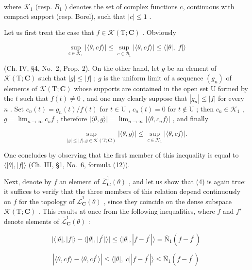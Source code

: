 where \(\mathcal{K}_{1}\) (resp. \(B_{1}\) ) denotes the set of complex functions c, continuous with compact support (resp. Borel), such that \(|c| \leqslant 1\) .

Let us first treat the case that \(f \in \mathcal{K}(\mathrm{T};\mathbf{C})\) . Obviously

\[
\sup _ {c \in \mathcal {K} _ {1}} | \langle \theta , c f \rangle | \leqslant \sup _ {c \in \mathcal {B} _ {1}} | \langle \theta , c f \rangle | \leqslant \langle | \theta |, | f | \rangle
\]

(Ch. IV, §4, No.~2, Prop. 2). On the other hand, let \(g\) be an element of \(\mathcal{K}(\mathrm{T};\mathbf{C})\) such that \(|g| \leqslant |f|\) ; \(g\) is the uniform limit of a sequence \((g_n)\) of elements of \(\mathcal{K}(\mathrm{T};\mathbf{C})\) whose supports are contained in the open set \(\mathrm{U}\) formed by the \(t\) such that \(f(t) \neq 0\) , and one may clearly suppose that \(|g_n| \leqslant |f|\) for every \(n\) . Set \(c_n(t) = g_n(t)/f(t)\) for \(t \in \mathrm{U}\) , \(c_n(t) = 0\) for \(t \notin \mathrm{U}\) ; then \(c_n \in \mathcal{K}_1\) , \(g = \lim_{n \to \infty} c_n f\) , therefore \(|\langle \theta, g \rangle| = \lim_{n \to \infty} |\langle \theta, c_n f \rangle|\) , and finally

\[
\sup _ {| g | \leqslant | f |, g \in \mathscr {K} (\mathrm{T}; \mathbf {C})} | \langle \theta , g \rangle | \leqslant \sup _ {c \in \mathscr {K} _ {1}} | \langle \theta , c f \rangle |.
\]

One concludes by observing that the first member of this inequality is equal to \(\langle|\theta|,|f|\rangle\) (Ch. III, §1, No.~6, formula (12)).

Next, denote by \(f\) an element of \(\overline{\mathcal{L}}_{\mathbf{C}}^{1}(\theta)\) , and let us show that (4) is again true: it suffices to verify that the three members of this relation depend continuously on \(f\) for the topology of \(\overline{\mathcal{L}}_{\mathbf{C}}^{1}(\theta)\) , since they coincide on the dense subspace \(\mathcal{K}(\mathrm{T};\mathbf{C})\) . This results at once from the following inequalities, where \(f\) and \(f'\) denote elements of \(\overline{\mathcal{L}}_{\mathbf{C}}^{1}(\theta)\) :

\[
| \langle | \theta |, | f | \rangle - \langle | \theta |, | f ^ {\prime} | \rangle | \leqslant \langle | \theta |, | f - f ^ {\prime} | \rangle = \overline {{\mathrm{N}}} _ {1} (f - f ^ {\prime})
\]

\[
| \langle \theta , c f \rangle - \langle \theta , c f ^ {\prime} \rangle | \leqslant \langle | \theta |, | c | | f - f ^ {\prime} | \rangle \leqslant \overline {{{\mathrm{N}}}} _ {1} (f - f ^ {\prime})
\]

